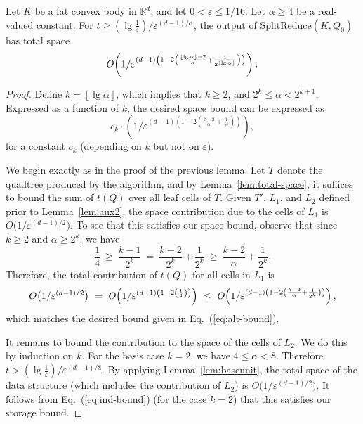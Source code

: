 \documentclass[11pt]{article}   \usepackage[letterpaper,hmargin=2.1cm,vmargin=3cm]{geometry}
\newcommand{\floor}[1]{\left\lfloor #1\right\rfloor}
\newcommand{\RE}{\mathbb{R}}    \newcommand{\ZZ}{\mathbb{Z}}    \newcommand{\eps}{\varepsilon}  \newcommand{\ST}{\,:\,}         \newcommand{\sq}{\square}
\newcommand{\OO}[1]{O\kern-2pt\left(#1\right)}  \newcommand{\half}[1]{\frac{#1}{2}}
\newcommand{\inv}[1]{\frac{1}{#1}}
\newcommand{\alg}{\textrm{SplitReduce}}
\begin{document}
\begin{lemma} \label{lem:trade-off-ub}
Let $K$ be a fat convex body in $\RE^d$, and let $0 < \eps \le 1/16$. Let $\alpha \ge 4$ be a real-valued constant. For $t \ge (\lg \inv{\eps})/\eps^{(d-1)/\alpha}$, the output of $\alg(K,Q_0)$ has total space
\[
	\OO{1/\eps^{(d-1)\left(1 - 2 \left(\frac{\floor{\lg \alpha} - 2}{\alpha} + \inv{2^{\floor{\lg\alpha}}} \right) \right)}}.
\]
\end{lemma}


\begin{proof}
Define $k = \floor{\lg\alpha}$, which implies that $k \ge 2$, and $2^{k} \leq \alpha < 2^{k+1}$. Expressed as a function of $k$, the desired space bound can be expressed as
\begin{equation} \label{eq:alt-bound}
	c_k \cdot \left( 1/\eps^{(d-1) \left(1 - 2 \left(\frac{k - 2}{\alpha} + \inv{2^k}\right) \right)} \right),
\end{equation}
for a constant $c_k$ (depending on $k$ but not on $\eps$).

We begin exactly as in the proof of the previous lemma. Let $T$ denote the quadtree produced by the algorithm, and by Lemma~\ref{lem:total-space}, it suffices to bound the sum of $t(Q)$ over all leaf cells of $T$. Given $T'$, $L_1$, and $L_2$ defined prior to Lemma~\ref{lem:aux2}, the space contribution due to the cells of $L_1$ is $O\big( 1/\eps^{(d-1)/2} \big)$. To see that this satisfies our space bound, observe that since $k \ge 2$ and $\alpha \ge 2^k$, we have
\[
	\inv{4}
		~ \ge ~ \frac{k-1}{2^{k}}
		~  =  ~ \frac{k-2}{2^{k}} + \inv{2^{k}}
		~ \ge ~ \frac{k-2}{\alpha} + \inv{2^{k}}.
\]
Therefore, the total contribution of $t(Q)$ for all cells in $L_1$ is
\begin{equation} \label{eq:ind-bound}
	O\big( 1/\eps^{(d-1)/2} \big)
		~  =  ~ \OO{1/\eps^{(d-1)\left(1 - 2\left(\inv{4}\right)\right)}}
		~ \le ~ \OO{1/\eps^{(d-1)\left(1 - 2\left(\frac{k-2}{\alpha} + \inv{2^{k}}\right)\right)}},
\end{equation}
which matches the desired bound given in Eq.~(\ref{eq:alt-bound}).

It remains to bound the contribution to the space of the cells of $L_2$. We do this by induction on $k$. For the basis case $k=2$, we have $4 \le \alpha < 8$. Therefore $t > (\lg \inv{\eps})/\eps^{(d-1)/8}$. By applying Lemma~\ref{lem:baseunit}, the total space of the data structure (which includes the contribution of $L_2$) is $O\big(1/\eps^{(d-1)/2}\big)$. It follows from Eq.~(\ref{eq:ind-bound}) (for the case $k = 2$) that this satisfies our storage bound.


\end{proof}
\end{document}
